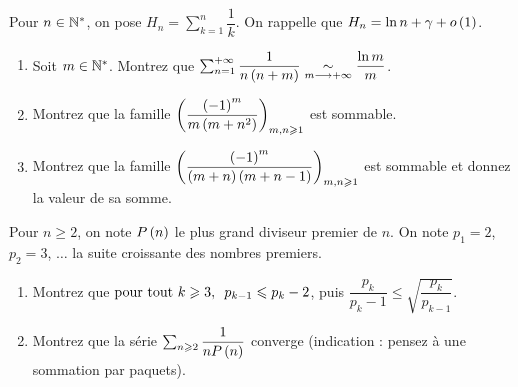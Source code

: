 \begin{exoss}[Exercice 27]~\\
Pour \(n\in\mathbb{N}^*\), on pose \(H_n=\sum_{k=1}^{n}\dfrac{1}{k}\). On rappelle que \(H_n=\ln n+\gamma+o\left(1\right)\).

\begin{enumerate}
    \item Soit \(m\in\mathbb{N}^*\). Montrez que \(\sum_{n=1}^{+\infty}\dfrac{1}{n\left(n+m\right)}\underset{m\longrightarrow+\infty}{\sim}\dfrac{\ln m}{m}\). \\
    \item Montrez que la famille \(\left(\dfrac{\left(-1\right)^m}{m\left(m+n^2\right)}\right)_{m,n\geqslant1}\) est sommable. \\
    \item Montrez que la famille \(\left(\dfrac{\left(-1\right)^m}{\left(m+n\right)\left(m+n-1\right)}\right)_{m,n\geqslant1}\) est sommable et donnez la valeur de sa somme.
\end{enumerate}
\end{exoss}



\begin{exoss}[Exercice 28]
Pour \(n\geq2\), on note \(P\left(n\right)\) le plus grand diviseur premier de \(n\). On note \(p_1=2\), \(p_2=3\), \(\dots\) la suite croissante des nombres premiers.

\begin{enumerate}
    \item Montrez que \(\quantifs{\tpt k\geq3}p_{k-1}\leq p_k-2\), puis \(\dfrac{p_k}{p_k-1}\leq\sqrt{\dfrac{p_k}{p_{k-1}}}\). \\
    \item Montrez que la série \(\sum_{n\geqslant2}\dfrac{1}{nP\left(n\right)}\) converge (indication : pensez à une sommation par paquets).
\end{enumerate}
\end{exoss}




